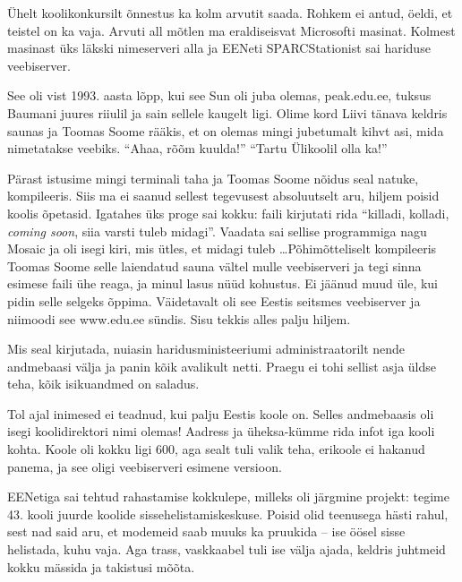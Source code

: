 Ühelt koolikonkursilt õnnestus ka kolm arvutit saada. Rohkem ei antud, 
öeldi, et teistel on ka vaja. Arvuti all mõtlen ma eraldiseisvat 
Microsofti masinat. Kolmest masinast üks läkski nimeserveri alla ja 
EENeti SPARCStationist sai hariduse veebiserver. 

See oli vist 1993. aasta lõpp, kui see Sun oli juba olemas, 
peak.edu.ee, tuksus Baumani juures riiulil ja 
sain sellele kaugelt ligi. Olime kord Liivi tänava keldris saunas ja Toomas Soome 
rääkis, et on olemas mingi jubetumalt kihvt asi, mida nimetatakse veebiks. 
\enquote{Ahaa, rõõm kuulda!} \enquote{Tartu Ülikoolil olla ka!} 

Pärast istusime mingi terminali taha ja Toomas Soome nõidus seal 
natuke, kompileeris. Siis ma ei saanud sellest tegevusest absoluutselt aru, hiljem
poisid koolis õpetasid. Igatahes üks proge sai 
kokku: faili kirjutati rida \enquote{killadi, kolladi, 
\emph{coming soon}, siia varsti tuleb midagi}. Vaadata sai sellise
programmiga nagu Mosaic ja oli isegi kiri, mis 
ütles, et midagi tuleb \ldots Põhimõtteliselt kompileeris Toomas Soome selle laiendatud 
sauna vältel mulle veebiserveri ja tegi sinna esimese faili ühe 
reaga, ja minul lasus nüüd kohustus. Ei jäänud muud üle, kui pidin selle 
selgeks õppima. Väidetavalt oli see Eestis seitsmes veebiserver ja 
niimoodi see www.edu.ee sündis. Sisu tekkis alles palju 
hiljem.


Mis seal kirjutada, nuiasin haridusministeeriumi 
administraatorilt nende andmebaasi välja ja panin kõik avalikult netti. Praegu ei tohi sellist asja üldse teha, kõik isikuandmed on 
saladus.


Tol ajal inimesed ei teadnud, kui palju Eestis koole on. Selles andmebaasis 
oli isegi koolidirektori nimi olemas! Aadress ja üheksa-kümme rida 
infot iga kooli kohta. Koole oli kokku ligi 600, aga sealt tuli valik 
teha, erikoole ei hakanud panema, ja see oligi veebiserveri esimene 
versioon. 

EENetiga sai
tehtud rahastamise kokkulepe, milleks oli järgmine projekt: tegime
43. kooli juurde koolide 
sissehelistamiskeskuse. Poisid olid teenusega hästi rahul, sest nad said 
aru, et modemeid saab muuks ka pruukida -- ise öösel sisse helistada, 
kuhu vaja. Aga trass, vaskkaabel tuli ise välja ajada, 
keldris juhtmeid kokku mässida ja takistusi mõõta. 


